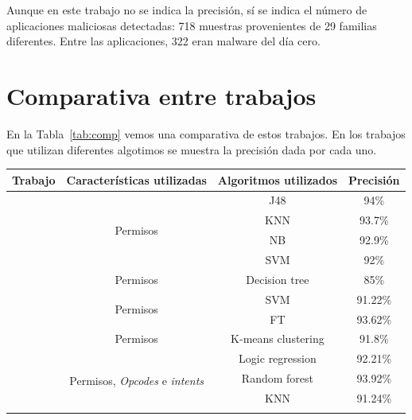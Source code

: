 Aunque en este trabajo no se indica la precisión, sí se indica el número de aplicaciones maliciosas detectadas: 718 muestras provenientes de 29 familias diferentes. Entre las aplicaciones, 322 eran malware del día cero.

\section{Comparativa entre trabajos}

En la Tabla~\ref{tab:comp} vemos una comparativa de estos trabajos. En los trabajos que utilizan diferentes algotimos se muestra la precisión dada por cada uno.

\begin{table}[H]
\centering
\begin{tabular}{|c|c|c|c|}
\hline
\textbf{Trabajo}   & \textbf{Características utilizadas} & \textbf{Algoritmos utilizados} & \textbf{Precisión} \\ \hline
\multirow{4}{*}{\hypersetup{citecolor=red}\cite{jiang}} & \multirow{4}{*}{Permisos} & J48                & 94\%               \\ \cline{3-4} 
                   & & KNN                & 93.7\%             \\ \cline{3-4} 
                   & & NB                 & 92.9\%             \\ \cline{3-4} 
                   & & SVM                & 92\%               \\ \hline
\hypersetup{citecolor=red}\cite{giang}                  & Permisos & Decision tree      & 85\%               \\ \hline
\multirow{2}{*}{\hypersetup{citecolor=red}\cite{sigpid}} & \multirow{2}{*}{Permisos} & SVM                & 91.22\%            \\ \cline{3-4} 
                   & & FT                 & 93.62\%            \\ \hline
\hypersetup{citecolor=red}\cite{aung}                  & Permisos & K-means clustering           & 91.8\%             \\ \hline
\multirow{4}{*}{\hypersetup{citecolor=red}\cite{kumar}} & \multirow{4}{*}{Permisos, \textit{Opcodes} e \textit{intents}} & Logic regression                & 92.21\%               \\ \cline{3-4} 
                   & & Random forest                & 93.92\%             \\ \cline{3-4} 
                   & & KNN                 & 91.24\%             \\ \cline{3-4} 

\end{tabular}
\end{table}
